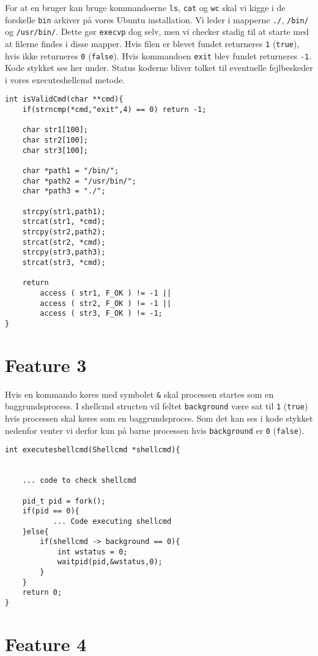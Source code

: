 \documentclass[danish]{report}
\begin{document}
For at en bruger kan bruge kommandoerne {\tt ls}, {\tt cat} og {\tt wc} skal vi kigge i de forskelle {\tt bin} arkiver på vores Ubuntu installation. Vi leder i mapperne {\tt ./}, {\tt /bin/} og {\tt /usr/bin/}. Dette gør {\tt execvp} dog selv, men vi checker stadig til at starte med at filerne findes i disse mapper. Hvis filen er blevet fundet returneres {\tt 1} ({\tt true}), hvis ikke returneres {\tt 0} ({\tt false}). Hvis kommandoen {\tt exit} blev fundet returneres {\tt -1}. Kode stykket ses her under. Status koderne bliver tolket til eventuelle fejlbeskeder i vores executeshellcmd metode.

\begin{lstlisting}
int isValidCmd(char **cmd){
    if(strncmp(*cmd,"exit",4) == 0) return -1;

    char str1[100];
    char str2[100];
    char str3[100];

    char *path1 = "/bin/";
    char *path2 = "/usr/bin/";
    char *path3 = "./";

    strcpy(str1,path1);
    strcat(str1, *cmd);
    strcpy(str2,path2);
    strcat(str2, *cmd);
    strcpy(str3,path3);
    strcat(str3, *cmd);

    return 
        access ( str1, F_OK ) != -1 || 
        access ( str2, F_OK ) != -1 || 
        access ( str3, F_OK ) != -1;
}
\end{lstlisting}


\section{Feature 3}

Hvis en kommando køres med symbolet {\tt \&} skal processen startes som en baggrundsprocess. I shellcmd structen vil feltet {\tt background} være sat til {\tt 1} ({\tt true}) hvis processen skal køres som en baggrundsproces. Som det kan ses i kode stykket nedenfor venter vi derfor kun på barne processen hvis {\tt background} er {\tt 0} ({\tt false}).
\begin{lstlisting}
int executeshellcmd(Shellcmd *shellcmd){
    

    ... code to check shellcmd

    pid_t pid = fork();
    if(pid == 0){
           ... Code executing shellcmd
    }else{
        if(shellcmd -> background == 0){
            int wstatus = 0;    
            waitpid(pid,&wstatus,0);
        }
    }
    return 0;
}
\end{lstlisting}

\section{Feature 4}
\end{document}
